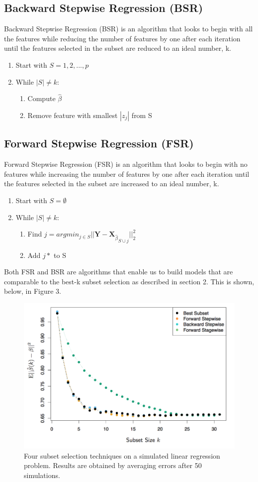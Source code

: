 \documentclass[a4paper]{article}
\begin{document}
\subsection{Backward Stepwise Regression (BSR)}
Backward Stepwise Regression (BSR) is an algorithm that looks to begin with all the features while reducing the number of features by one after each iteration until the features selected in the subset are reduced to an ideal number, k.
\begin{enumerate}
	\item Start with $S = {1,2,...,p}$
	\item While $|S| \neq k$:
	\begin{enumerate}
		\item Compute $\hat{\beta}$
		\item Remove feature with smallest $|z_{j}|$ from S
	\end{enumerate}
\end{enumerate}

\subsection{Forward Stepwise Regression (FSR)}
Forward Stepwise Regression (FSR) is an algorithm that looks to begin with no features while increasing the number of features by one after each iteration until the features selected in the subset are increased to an ideal number, k.
\begin{enumerate}
	\item Start with $ S = \emptyset $
	\item While $|S| \neq k$:
	\begin{enumerate}
		\item Find $j = argmin_{j \in{S}} || {\boldsymbol{Y}-\boldsymbol{X}_{\hat{\beta}}}_{S \cup {j}}||_{2}^{2} $
		\item Add $j*$ to S
	\end{enumerate}
\end{enumerate}

\vspace{1mm}
\noindent Both FSR and BSR are algorithms that enable us to build models that are comparable to the best-k subset selection as described in section 2. This is shown, below, in Figure 3.

\begin{figure}[H]
\centering
\captionsetup{justification=centering}
\includegraphics[width=1\textwidth]{Figure_3.PNG}
\caption{\label{fig:3}Four subset selection techniques on a simulated linear regression problem. Results are obtained by averaging errors after 50 simulations.}
\end{figure}
\end{document}
